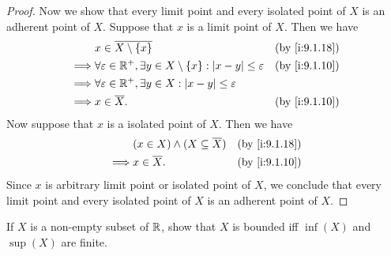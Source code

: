 \begin{proof}
  Now we show that every limit point and every isolated point of \(X\) is an adherent point of \(X\).
  Suppose that \(x\) is a limit point of \(X\).
  Then we have
  \begin{align*}
             & x \in \overline{X \setminus \set{x}}                                                           &  & \by{i:9.1.18} \\
    \implies & \forall \varepsilon \in \R^+, \exists y \in X \setminus \set{x} : \abs{x - y} \leq \varepsilon &  & \by{i:9.1.10} \\
    \implies & \forall \varepsilon \in \R^+, \exists y \in X : \abs{x - y} \leq \varepsilon                                      \\
    \implies & x \in \overline{X}.                                                                            &  & \by{i:9.1.10}
  \end{align*}
  Now suppose that \(x\) is a isolated point of \(X\).
  Then we have
  \begin{align*}
             & (x \in X) \land (X \subseteq \overline{X}) &  & \by{i:9.1.18} \\
    \implies & x \in \overline{X}.                        &  & \by{i:9.1.10}
  \end{align*}
  Since \(x\) is arbitrary limit point or isolated point of \(X\), we conclude that every limit point and every isolated point of \(X\) is an adherent point of \(X\).
\end{proof}

\begin{ex}\label{i:ex:9.1.10}
  If \(X\) is a non-empty subset of \(\mathbb{R}\), show that \(X\) is bounded iff \(\inf(X)\) and \(\sup(X)\) are finite.
\end{ex}

